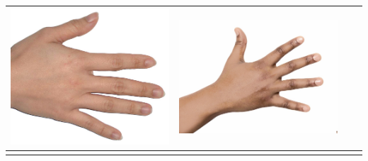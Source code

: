 \begin{longtable}{|N||c|c|c|}
\begin{minipage}{.29\textwidth}
    \includegraphics[width=\textwidth,height=\textheight,keepaspectratio]{../inputs/hand_light.jpg}
  \end{minipage} & 
  \begin{minipage}{.29\textwidth}
    \includegraphics[width=\textwidth,height=\textheight,keepaspectratio]{../rc_test/outputs/20170516_proportional_test/hand_dark_to_hand_light.jpg}
  \end{minipage} \\
\hline  \label{row:prop_test_hand_dark_to_hand_pale} &
  \begin{minipage}{.29\textwidth}

\end{minipage}
\end{longtable}
